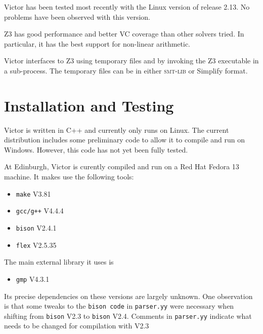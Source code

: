 \documentclass[12pt,fleqn]{article}
\newcommand{\zthree}{\textsc{Z}3}
\newcommand{\smtlib}{\textsc{smt-lib}}
\begin{document}
Victor has been tested most recently with the Linux version of release
2.13.  No problems have been observed with this version.


\zthree{} has good performance and better VC coverage than other
solvers tried.  In particular, it has the best support for non-linear
arithmetic.

Victor interfaces to \zthree{} using temporary files and by invoking
the \zthree{} executable in a sub-process.
The temporary files can be in either \smtlib{} or Simplify format.

\section{Installation and Testing}

Victor is written in C++ and currently only runs on Linux.  The
current distribution includes some preliminary code to allow it to
compile and run on Windows.  However, this code has not yet been fully
tested.

At Edinburgh, Victor is curently compiled and run on a Red Hat Fedora
13 machine.  It makes use the following tools:
\begin{itemize}
\item \texttt{make} V3.81
\item \texttt{gcc/g++} V4.4.4
\item \texttt{bison}  V2.4.1
\item \texttt{flex} V2.5.35
\end{itemize}
The main external library it uses is
\begin{itemize}
\item \texttt{gmp} V4.3.1
\end{itemize}
Its precise dependencies on these versions are largely unknown. 
%
One observation is that some tweaks to the \texttt{bison code} in
\texttt{parser.yy} were necessary when shifting from \texttt{bison}
V2.3 to \texttt{bison} V2.4.  Comments in \texttt{parser.yy} indicate
what needs to be changed for compilation with V2.3
\end{document}
